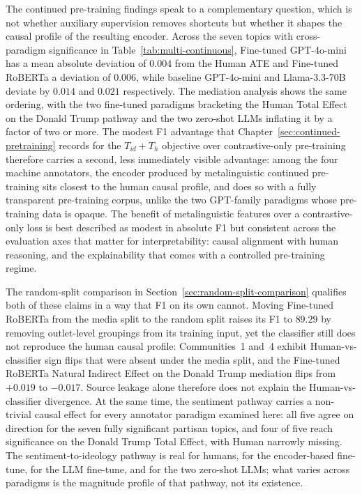 The continued pre-training findings speak to a complementary question, which is not whether auxiliary supervision removes shortcuts but whether it shapes the causal profile of the resulting encoder. Across the seven topics with cross-paradigm significance in Table~\ref{tab:multi-continuous}, Fine-tuned GPT-4o-mini has a mean absolute deviation of $0.004$ from the Human ATE and Fine-tuned RoBERTa a deviation of $0.006$, while baseline GPT-4o-mini and Llama-3.3-70B deviate by $0.014$ and $0.021$ respectively. The mediation analysis shows the same ordering, with the two fine-tuned paradigms bracketing the Human Total Effect on the Donald Trump pathway and the two zero-shot LLMs inflating it by a factor of two or more. The modest F1 advantage that Chapter~\ref{sec:continued-pretraining} records for the $T_{id} + T_h$ objective over contrastive-only pre-training therefore carries a second, less immediately visible advantage: among the four machine annotators, the encoder produced by metalinguistic continued pre-training sits closest to the human causal profile, and does so with a fully transparent pre-training corpus, unlike the two GPT-family paradigms whose pre-training data is opaque. The benefit of metalinguistic features over a contrastive-only loss is best described as modest in absolute F1 but consistent across the evaluation axes that matter for interpretability: causal alignment with human reasoning, and the explainability that comes with a controlled pre-training regime.

The random-split comparison in Section~\ref{sec:random-split-comparison} qualifies both of these claims in a way that F1 on its own cannot. Moving Fine-tuned RoBERTa from the media split to the random split raises its F1 to $89.29$ by removing outlet-level groupings from its training input, yet the classifier still does not reproduce the human causal profile: Communities~1 and~4 exhibit Human-vs-classifier sign flips that were absent under the media split, and the Fine-tuned RoBERTa Natural Indirect Effect on the Donald Trump mediation flips from $+0.019$ to $-0.017$. Source leakage alone therefore does not explain the Human-vs-classifier divergence. At the same time, the sentiment pathway carries a non-trivial causal effect for every annotator paradigm examined here: all five agree on direction for the seven fully significant partisan topics, and four of five reach significance on the Donald Trump Total Effect, with Human narrowly missing. The sentiment-to-ideology pathway is real for humans, for the encoder-based fine-tune, for the LLM fine-tune, and for the two zero-shot LLMs; what varies across paradigms is the magnitude profile of that pathway, not its existence.

